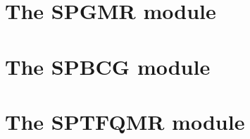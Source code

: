 \section{The SPGMR module}\label{ss:spgmr}


\section{The SPBCG module}\label{ss:spbcg}


\section{The SPTFQMR module}\label{ss:sptfqmr}


